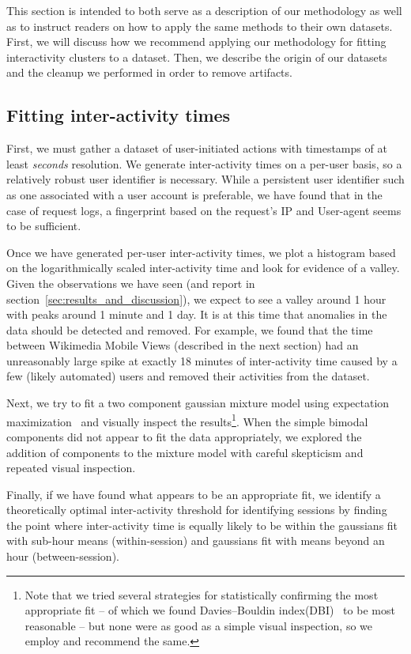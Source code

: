 This section is intended to both serve as a description of our methodology as well as to instruct readers on how to apply the same methods to their own datasets.  First, we will discuss how we recommend applying our methodology for fitting interactivity clusters to a dataset.  Then, we describe the origin of our datasets and the cleanup we performed in order to remove artifacts.

\vskip 15pt
\subsection{Fitting inter-activity times}
First, we must gather a dataset of user-initiated actions with timestamps of at least \emph{seconds} resolution.  We generate inter-activity times on a per-user basis, so a relatively robust user identifier is necessary.  While a persistent user identifier such as one associated with a user account is preferable, we have found that in the case of request logs, a fingerprint based on the request's IP and User-agent seems to be sufficient.

Once we have generated per-user inter-activity times, we plot a histogram based on the logarithmically scaled inter-activity time and look for evidence of a valley.  Given the observations we have seen (and report in section~\ref{sec:results_and_discussion}), we expect to see a valley around 1 hour with peaks around 1 minute and 1 day.  It is at this time that anomalies in the data should be detected and removed.  For example, we found that the time between Wikimedia Mobile Views (described in the next section) had an unreasonably large spike at exactly 18 minutes of inter-activity time caused by a few (likely automated) users and removed their activities from the dataset.

Next, we try to fit a two component gaussian mixture model using expectation maximization~\cite{benaglia2009mixtools} and visually inspect the results\footnote{Note that we tried several strategies for statistically confirming the most appropriate fit -- of which we found Davies--Bouldin index(DBI)~\cite{davies1979cluster} to be most reasonable -- but none were as good as a simple visual inspection, so we employ and recommend the same.}.  When the simple bimodal components did not appear to fit the data appropriately, we explored the addition of components to the mixture model with careful skepticism and repeated visual inspection.

Finally, if we have found what appears to be an appropriate fit, we identify a theoretically optimal inter-activity threshold for identifying sessions by finding the point where inter-activity time is equally likely to be within the gaussians fit with sub-hour means (within-session) and gaussians fit with means beyond an hour (between-session).

